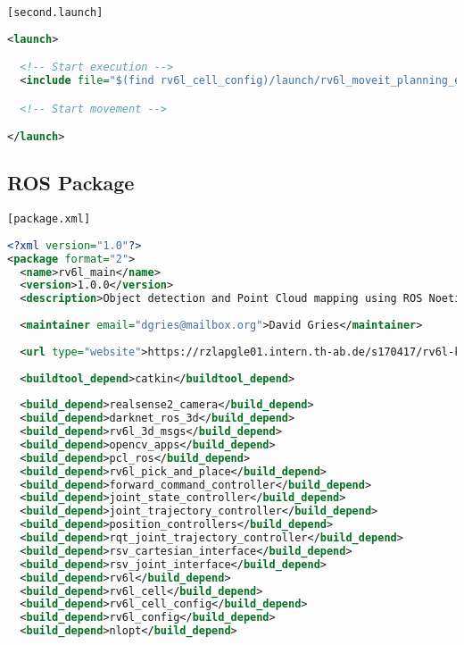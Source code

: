 \lstinline{[second.launch]}

\begin{lstlisting}[language=xml]
  <launch>

  <!-- Start execution -->
  <include file="$(find rv6l_cell_config)/launch/rv6l_moveit_planning_execution_tut.launch" />

  <!-- Start movement -->

</launch>
\end{lstlisting}

\subsection{ROS Package}

\lstinline{[package.xml]}

\begin{lstlisting}[language=xml]
<?xml version="1.0"?>
<package format="2">
  <name>rv6l_main</name>
  <version>1.0.0</version>
  <description>Object detection and Point Cloud mapping using ROS Noetic and Intel RealSense 435</description>
  
  <maintainer email="dgries@mailbox.org">David Gries</maintainer>
  
  <url type="website">https://rzlapgle01.intern.th-ab.de/s170417/rv6l-kinect</url>
  
  <buildtool_depend>catkin</buildtool_depend>
  
  <build_depend>realsense2_camera</build_depend>
  <build_depend>darknet_ros_3d</build_depend>
  <build_depend>rv6l_3d_msgs</build_depend>
  <build_depend>opencv_apps</build_depend>
  <build_depend>pcl_ros</build_depend>
  <build_depend>rv6l_pick_and_place</build_depend>
  <build_depend>forward_command_controller</build_depend>
  <build_depend>joint_state_controller</build_depend>
  <build_depend>joint_trajectory_controller</build_depend>
  <build_depend>position_controllers</build_depend>
  <build_depend>rqt_joint_trajectory_controller</build_depend>
  <build_depend>rsv_cartesian_interface</build_depend>
  <build_depend>rsv_joint_interface</build_depend>
  <build_depend>rv6l</build_depend>
  <build_depend>rv6l_cell</build_depend>
  <build_depend>rv6l_cell_config</build_depend>
  <build_depend>rv6l_config</build_depend>
  <build_depend>nlopt</build_depend>
  

\end{lstlisting}
